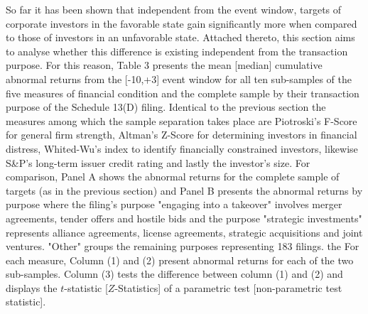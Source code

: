 \documentclass[12pt]{article}
\begin{document}
So far it has been shown that independent from the event window, targets of corporate investors in the favorable state gain significantly more when compared to those of investors in an unfavorable state. Attached thereto, this section aims to analyse whether this difference is existing independent from the transaction purpose. For this reason, Table 3 presents the mean [median] cumulative abnormal returns from the [-10,+3] event window for all ten sub-samples of the five measures of financial condition and the complete sample by their transaction purpose of the Schedule 13(D) filing. Identical to the previous section the measures among which the sample separation takes place are Piotroski's F-Score for general firm strength, Altman's Z-Score for determining investors in financial distress, Whited-Wu's index to identify financially constrained investors, likewise S\&P's long-term issuer credit rating and lastly the investor's size. For comparison, Panel A shows the abnormal returns for the complete sample of targets (as in the previous section) and Panel B presents the abnormal returns by purpose where the filing's purpose "engaging into a takeover" involves merger agreements, tender offers and hostile bids and the purpose "strategic investments" represents alliance agreements, license agreements, strategic acquisitions and joint ventures. "Other" groups the remaining purposes representing 183 filings. the For each measure, Column (1) and (2) present abnormal returns for each of the two sub-samples. Column (3) tests the difference between column (1) and (2) and displays the  $t$-statistic [$Z$-Statistics] of a parametric test [non-parametric test statistic]. 
\end{document}
